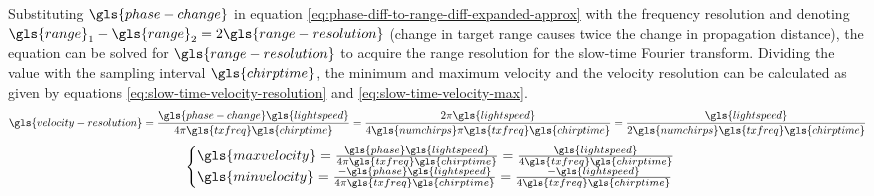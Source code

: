 Substituting $\gls{phase-change}$ in equation \ref{eq:phase-diff-to-range-diff-expanded-approx}
with the frequency resolution and denoting $\gls{range}_1 - \gls{range}_2 = 2 \gls{range-resolution}$ 
(change in target range causes twice the change in propagation distance),
the equation can be solved for $\gls{range-resolution}$ to acquire the range resolution
for the slow-time Fourier transform. Dividing the value with the sampling interval $\gls{chirptime}$,
the minimum and maximum velocity and the velocity resolution can be calculated as given by equations
\ref{eq:slow-time-velocity-resolution} and \ref{eq:slow-time-velocity-max}.
\begin{equation}
    \label{eq:slow-time-velocity-resolution}
    \gls{velocity-resolution} = \frac{\gls{phase-change} \gls{lightspeed}}{4 \pi \gls{txfreq} \gls{chirptime}} 
    = \frac{2 \pi \gls{lightspeed}}{4 \gls{numchirps} \pi \gls{txfreq} \gls{chirptime}} 
    = \frac{\gls{lightspeed}}{2 \gls{numchirps} \gls{txfreq} \gls{chirptime}}
\end{equation}
\begin{equation}
    \label{eq:slow-time-velocity-max}
    \begin{cases}
        \gls{maxvelocity} = \frac{\gls{phase} \gls{lightspeed}}{4 \pi \gls{txfreq} \gls{chirptime}} = \frac{\gls{lightspeed}}{4 \gls{txfreq} \gls{chirptime}}\\
        \gls{minvelocity} = \frac{- \gls{phase} \gls{lightspeed}}{4 \pi \gls{txfreq} \gls{chirptime}} = \frac{-\gls{lightspeed}}{4 \gls{txfreq} \gls{chirptime}}
    \end{cases}
\end{equation}
